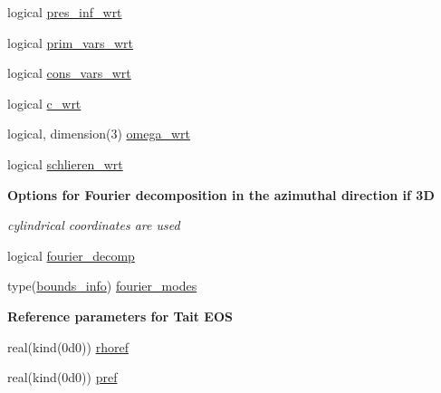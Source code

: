 \begin{Indent}
\begin{DoxyCompactItemize}
\item 
logical \hyperlink{namespacem__global__parameters_a34bbf8acae0d925bb193265fb2966d1c}{pres\+\_\+inf\+\_\+wrt}
\item 
logical \hyperlink{namespacem__global__parameters_a795878d693cec161db5f5c06aea7331e}{prim\+\_\+vars\+\_\+wrt}
\item 
logical \hyperlink{namespacem__global__parameters_ad23223100223bdb6d7f59fed5ec7bbb9}{cons\+\_\+vars\+\_\+wrt}
\item 
logical \hyperlink{namespacem__global__parameters_a56a071ae0b79b39a826646ace37972eb}{c\+\_\+wrt}
\item 
logical, dimension(3) \hyperlink{namespacem__global__parameters_aaf0ab8b40d717a67662251516870b1a6}{omega\+\_\+wrt}
\item 
logical \hyperlink{namespacem__global__parameters_acd86b6cea52b83b147f680d9d6da342c}{schlieren\+\_\+wrt}
\end{DoxyCompactItemize}
\end{Indent}
\begin{Indent}\textbf{ Options for Fourier decomposition in the azimuthal direction if 3D}\par
{\em cylindrical coordinates are used }\begin{DoxyCompactItemize}
\item 
logical \hyperlink{namespacem__global__parameters_a41c2be7ba7b793490633ce040f949274}{fourier\+\_\+decomp}
\item 
type(\hyperlink{structm__derived__types_1_1bounds__info}{bounds\+\_\+info}) \hyperlink{namespacem__global__parameters_a085b3000bac43a3ff2963646c8ecd96a}{fourier\+\_\+modes}
\end{DoxyCompactItemize}
\end{Indent}
\begin{Indent}\textbf{ Reference parameters for Tait E\+OS}\par
\begin{DoxyCompactItemize}
\item 
real(kind(0d0)) \hyperlink{namespacem__global__parameters_a485a360d73013d7bce1daa01df404534}{rhoref}
\item 
real(kind(0d0)) \hyperlink{namespacem__global__parameters_aae2170af8a68c7dcdd91910aad867ef4}{pref}
\end{DoxyCompactItemize}
\end{Indent}
